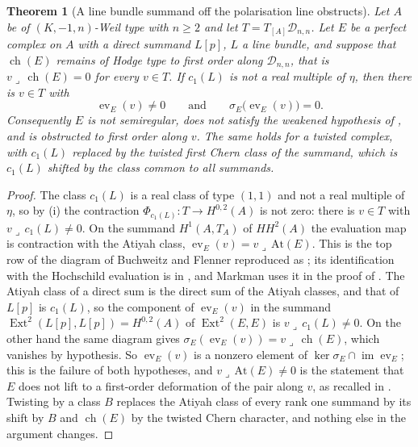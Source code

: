 \documentclass[11pt,reqno]{amsart}
\theoremstyle{plain}
\newtheorem{theorem}{Theorem}[section]
\theoremstyle{definition}
\theoremstyle{remark}
\newcommand{\cD}{\mathcal{D}}
\DeclareMathOperator{\ch}{ch}
\DeclareMathOperator{\Ext}{Ext}
\DeclareMathOperator{\image}{im}
\begin{document}
\begin{theorem}[A line bundle summand off the polarisation line obstructs]
\label{thm:linebundle}
Let $A$ be of $(K,-1,n)$-Weil type with $n\ge2$ and let $T=T_{[A]}\cD_{n,n}$.
Let $E$ be a perfect complex on $A$ with a direct summand $L[p]$, $L$ a line
bundle, and suppose that $\ch(E)$ remains of Hodge type to first order along
$\cD_{n,n}$, that is $v\lrcorner\,\ch(E)=0$ for every $v\in T$. If $c_{1}(L)$
is not a real multiple of $\eta$, then there is $v\in T$ with
\[
  \operatorname{ev}_{E}(v)\ne0
  \qquad\text{and}\qquad
  \sigma_{E}\bigl(\operatorname{ev}_{E}(v)\bigr)=0 .
\]
Consequently $E$ is not semiregular, does not satisfy the weakened hypothesis
of \cite[Question 11.4]{Mar25b}, and is obstructed to first order along $v$.
The same holds for a twisted complex, with $c_{1}(L)$ replaced by the twisted
first Chern class of the summand, which is $c_{1}(L)$ shifted by the class
common to all summands.
\end{theorem}

\begin{proof}
The class $c_{1}(L)$ is a real class of type $(1,1)$ and not a real multiple
of $\eta$, so by (i) the contraction
$\Phi_{c_{1}(L)}\colon T\to H^{0,2}(A)$ is not zero: there is $v\in T$ with
$v\lrcorner\,c_{1}(L)\ne0$. On the summand $H^{1}(A,T_{A})$ of $HH^{2}(A)$ the
evaluation map is contraction with the Atiyah class,
$\operatorname{ev}_{E}(v)=v\lrcorner\,\mathrm{At}(E)$. This is the top row of
the diagram of Buchweitz and Flenner reproduced as \cite[(2.1)]{Mar25b}; its
identification with the Hochschild evaluation is in \cite{BF08}, and Markman
uses it in the proof of \cite[Lemma~11.3]{Mar25b}. The Atiyah class of a
direct sum is the direct sum of the Atiyah classes, and that of $L[p]$ is
$c_{1}(L)$, so the
component of $\operatorname{ev}_{E}(v)$ in the summand
$\Ext^{2}(L[p],L[p])=H^{0,2}(A)$ of $\Ext^{2}(E,E)$ is
$v\lrcorner\,c_{1}(L)\ne0$. On the other hand the same diagram gives
$\sigma_{E}(\operatorname{ev}_{E}(v))=v\lrcorner\,\ch(E)$, which vanishes by
hypothesis. So $\operatorname{ev}_{E}(v)$ is a nonzero element of
$\ker\sigma_{E}\cap\image\operatorname{ev}_{E}$; this is the failure of both
hypotheses, and $v\lrcorner\,\mathrm{At}(E)\ne0$ is the statement that $E$
does not lift to a first-order deformation of the pair along $v$, as recalled
in \cite[Section 2]{Mar25b}. Twisting by a class $B$ replaces the Atiyah
class of every rank one summand by its shift by $B$ and $\ch(E)$ by the
twisted Chern character, and nothing else in the argument changes.
\end{proof}
\end{document}
